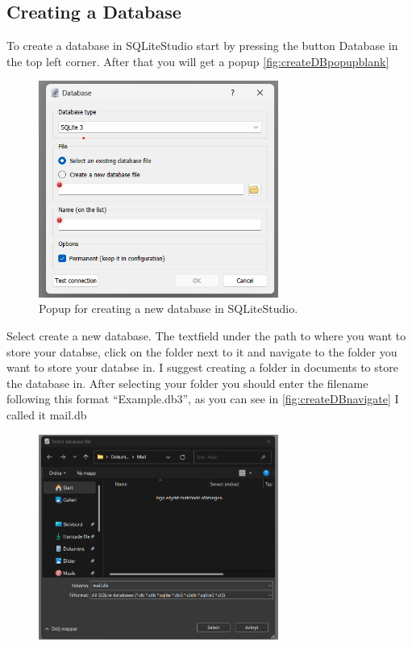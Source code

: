 \documentclass[a4paper,11pt,oneside]{article}
\begin{document}
\begin{sloppypar}
\subsection{Creating a Database}
\label{sqliteStudioCreatingDatabase}
To create a database in SQLiteStudio start by pressing the button Database in the top left corner. After that you will get a popup \autoref{fig:createDBpopupblank}
\begin{figure}[!htb]
  \centering
  \includegraphics[width=0.7\textwidth]{sqlitestudio/create_database/create_database_popup.png}
  \caption{Popup for creating a new database in SQLiteStudio.}
  \label{fig:createDBpopupblank}
\end{figure}
Select create a new database. The textfield under the path to where you want to store your databse, click on the folder next to it and navigate to the folder you want to store your databse in. I suggest creating a folder in documents to store the database in. After selecting your folder you should enter the filename following this format ``Example.db3'', as you can see in \autoref{fig:createDBnavigate} I called it mail.db  
\begin{figure}[!htb]
  \centering
  \includegraphics[width=0.7\textwidth]{sqlitestudio/create_database/create_database_navigate.png}

\end{figure}
\end{sloppypar}
\end{document}
